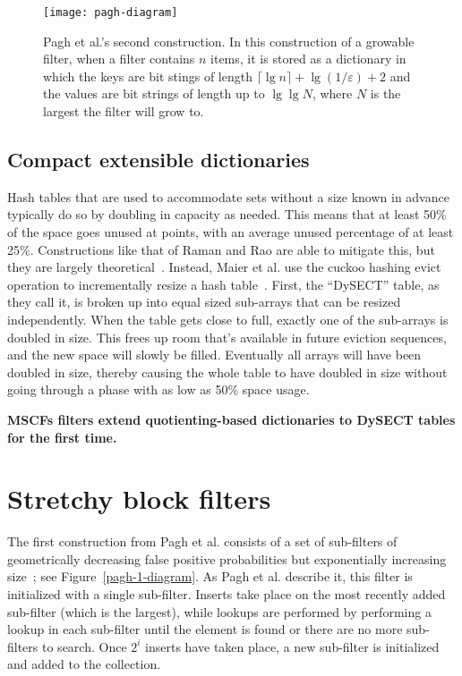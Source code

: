 \documentclass[letterpaper,twocolumn,10pt]{article}
\newcommand{\etal}{et al.}
\newcommand{\Taffy}{Stretchy}
\newcommand{\MTCF}{MSCF}
\newcommand{\Taffy}{Taffy}
\newcommand{\MTCF}{MTCF}
\begin{document}
\begin{figure}[b!]
\texttt{[image: pagh-diagram]}
\caption{\label{pagh-diagram}
Pagh \etal{}'s second construction.
In this construction of a growable filter, when a filter contains $n$ items, it is stored as a dictionary in which the keys are bit stings of length $\lceil \lg n \rceil + \lg (1/\varepsilon) + 2$ and the values are bit strings of length up to $\lg \lg N$, where $N$ is the largest the filter will grow to.
}
\end{figure}



\subsection{Compact extensible dictionaries}

Hash tables that are used to accommodate sets without a size known in advance typically do so by doubling in capacity as needed.
This means that at least 50\% of the space goes unused at points, with an average unused percentage of at least 25\%.
Constructions like that of Raman and Rao are able to mitigate this, but they are largely theoretical~\cite{succinct}.
Instead, Maier \etal{} use the cuckoo hashing evict operation to incrementally resize a hash table~\cite{dysect}.
First, the ``DySECT'' table, as they call it, is broken up into equal sized sub-arrays that can be resized independently.
When the table gets close to full, exactly one of the sub-arrays is doubled in size.
This frees up room that's available in future eviction sequences, and the new space will slowly be filled.
Eventually all arrays will have been doubled in size, thereby causing the whole table to have doubled in size without going through a phase with as low as 50\% space usage.

{\bf \MTCF{}s filters extend quotienting-based dictionaries to DySECT tables for the first time.}

\section{\Taffy{} block filters}
\label{tbf}

The first construction from Pagh \etal{} consists of a set of sub-filters of geometrically decreasing false positive probabilities but exponentially increasing size~\cite{psw}; see Figure~\ref{pagh-1-diagram}.
As Pagh \etal{} describe it, this filter is initialized with a single sub-filter.
Inserts take place on the most recently added sub-filter (which is the largest), while lookups are performed by performing a lookup in each sub-filter until the element is found or there are no more sub-filters to search.
Once $2^i$ inserts have taken place, a new sub-filter is initialized and added to the collection.
\end{document}
